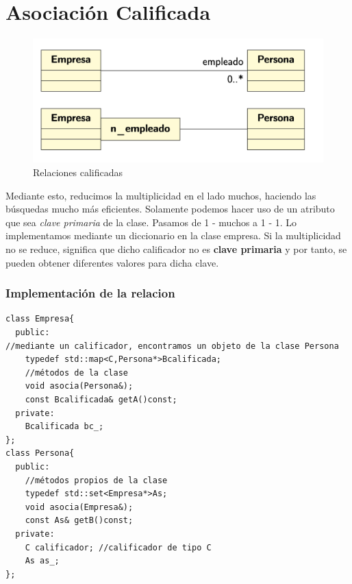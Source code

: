\chapter{Asociación Calificada}
\begin{figure}[h]
	\centering
	\includegraphics[width=\textwidth]{Imagenes/asc.png}\vspace*{0.2cm}
	\caption{Relaciones calificadas}
\end{figure}
Mediante esto, reducimos la multiplicidad en el lado muchos, haciendo las búsquedas mucho más eficientes.
Solamente podemos hacer uso de un atributo que sea \textit{clave primaria} de la clase.
Pasamos de 1 - muchos a 1 - 1.
Lo implementamos mediante un diccionario en la clase empresa.
Si la multiplicidad no se reduce, significa que dicho calificador no es \textbf{clave primaria} y por tanto, se pueden obtener diferentes valores para dicha clave.
\newpage
\subsection{Implementación de la relacion}
\begin{lstlisting}[frame=single]
class Empresa{
  public:
//mediante un calificador, encontramos un objeto de la clase Persona
    typedef std::map<C,Persona*>Bcalificada; 
    //métodos de la clase
    void asocia(Persona&);
    const Bcalificada& getA()const;
  private:
    Bcalificada bc_;
};
class Persona{
  public:
    //métodos propios de la clase
    typedef std::set<Empresa*>As;
    void asocia(Empresa&);
    const As& getB()const;
  private:
    C calificador; //calificador de tipo C
    As as_;
};
\end{lstlisting}